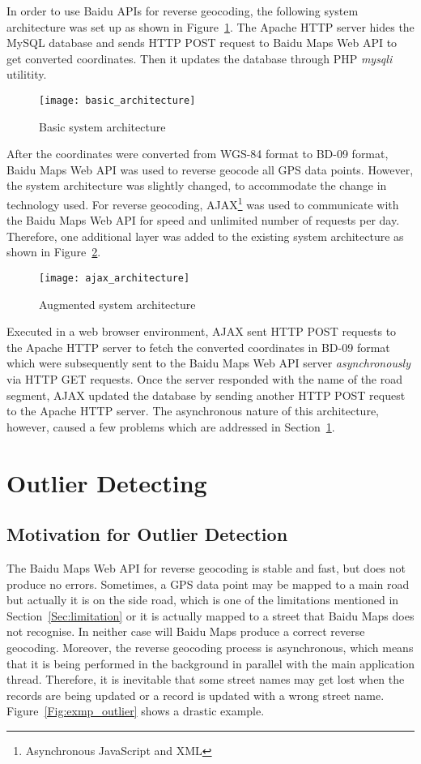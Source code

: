 In order to use Baidu APIs for reverse geocoding, the following system architecture was set up as shown in Figure~\ref{Fig:basic_architecture}. The Apache HTTP server hides the MySQL database and sends HTTP POST request to Baidu Maps Web API to get converted coordinates. Then it updates the database through PHP \emph{mysqli} utilitity. 

\begin{figure}[h]
\texttt{[image: basic\_architecture]}
\centering
\caption{Basic system architecture}\label{Fig:basic_architecture}
\end{figure}

After the coordinates were converted from WGS-84 format to BD-09 format, Baidu Maps Web API was used to reverse geocode all GPS data points. However, the system architecture was slightly changed, to accommodate the change in technology used. For reverse geocoding, AJAX\footnote{Asynchronous JavaScript and XML} was used to communicate with the Baidu Maps Web API for speed and unlimited number of requests per day. Therefore, one additional layer was added to the existing system architecture as shown in Figure~\ref{Fig:ajax_architecture}. 

\begin{figure}[h]
\texttt{[image: ajax\_architecture]}
\centering
\caption{Augmented system architecture}\label{Fig:ajax_architecture}
\end{figure}

Executed in a web browser environment, AJAX sent HTTP POST requests to the Apache HTTP server to fetch the converted coordinates in BD-09 format which were subsequently sent to the Baidu Maps Web API server \emph{asynchronously} via HTTP GET requests. Once the server responded with the name of the road segment, AJAX updated the database by sending another HTTP POST request to the Apache HTTP server. The asynchronous nature of this architecture, however, caused a few problems which are addressed in Section~\ref{outlier_detecting}. 

\section{Outlier Detecting}\label{outlier_detecting}
\subsection{Motivation for Outlier Detection}
The Baidu Maps Web API for reverse geocoding is stable and fast, but does not produce no errors. Sometimes, a GPS data point may be mapped to a main road but actually it is on the side road, which is one of the limitations mentioned in Section~\ref{Sec:limitation} or it is actually mapped to a street that Baidu Maps does not recognise. In neither case will Baidu Maps produce a correct reverse geocoding. Moreover, the reverse geocoding process is asynchronous, which means that it is being performed in the background in parallel with the main application thread. Therefore, it is inevitable that some street names may get lost when the records are being updated or a record is updated with a wrong street name. Figure~\ref{Fig:exmp_outlier} shows a drastic example.

